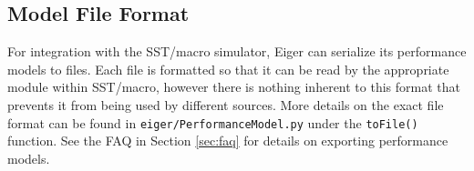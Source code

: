 \subsection{Model File Format}
For integration with the SST/macro simulator, Eiger can serialize its
performance models to files. Each file is formatted so that it can be read
by the appropriate module within SST/macro, however there is nothing
inherent to this format that prevents it from being used by different
sources. More details on the exact file format can be found in
\texttt{eiger/PerformanceModel.py} under the \texttt{toFile()} function. 
See the FAQ in Section \ref{sec:faq}
for details on exporting performance models.
